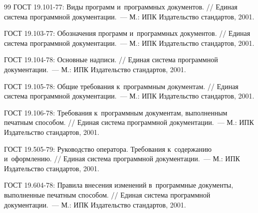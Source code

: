 \documentclass[12pt,a4paper]{extarticle}
\begin{document}
\renewcommand{\refname}{}
\begin{thebibliography}{99}
ГОСТ 19.101-77: Виды программ и~программных документов. // Единая система программной документации.~--- М.: ИПК Издательство стандартов, 2001.

ГОСТ 19.103-77: Обозначения программ и~программных документов. // Единая система программной документации.~--- М.: ИПК Издательство стандартов, 2001.

ГОСТ 19.104-78: Основные надписи. // Единая система программной документации.~--- М.: ИПК Издательство стандартов, 2001.

ГОСТ 19.105-78: Общие требования к~программным документам. // Единая система программной документации.~--- М.: ИПК Издательство стандартов, 2001.

ГОСТ 19.106-78: Требования к~программным документам, выполненным печатным способом. // Единая система программной документации.~--- М.: ИПК Издательство стандартов, 2001.

ГОСТ 19.505-79: Руководство оператора. Требования к~содержанию и~оформлению. // Единая система программной документации.~--- М.: ИПК Издательство стандартов, 2001.

ГОСТ 19.604-78: Правила внесения изменений в~программные документы, выполненные печатным способом. // Единая система программной документации.~--- М.: ИПК Издательство стандартов, 2001.
\end{thebibliography}

\clearpage


\end{document}
